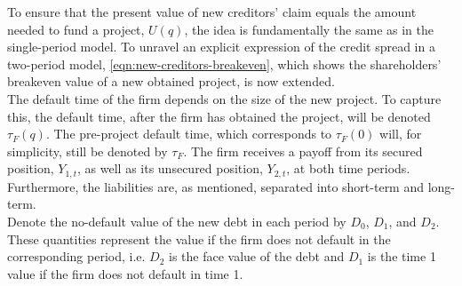 \documentclass[main.tex]{subfiles}
\begin{document}
        To ensure that the present value of new creditors' claim equals the amount needed to fund a project, $U(q)$,
        the idea is fundamentally the same as in the single-period model.
        To unravel an explicit expression of the credit spread in a two-period model,
        \cref{eqn:new-creditors-breakeven}, which shows the shareholders' breakeven value of a new obtained project, is now extended.
        \\
        The default time of the firm depends on the size of the new project.
        To capture this, the default time, after the firm has obtained the project, 
        will be denoted $\tau_{F}(q)$.
        The pre-project default time, which corresponds to $\tau_{F}(0)$ will, for simplicity,
        still be denoted by $\tau_{F}$.
        The firm receives a payoff from its secured position, $Y_{1,t}$, 
        as well as its unsecured position, $Y_{2,t}$, at both time periods.
        Furthermore, the liabilities are, as mentioned, separated into short-term and long-term.
        \\
        Denote the no-default value of the new debt in each period by $D_{0}$, $D_{1}$, and $D_{2}$.
        These quantities represent the value if the firm does not default in the corresponding period,
        i.e. $D_{2}$ is the face value of the debt and $D_{1}$ 
        is the time 1 value if the firm does not default in time 1.
\end{document}
